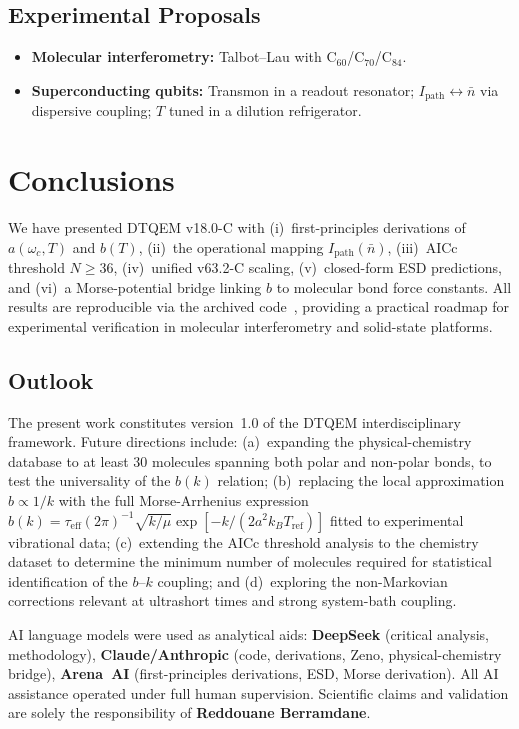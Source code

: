 \documentclass[reprint,amsmath,amssymb,aps,pra,superscriptaddress]{revtex4-2}
\begin{document}
\subsection{Experimental Proposals}
\begin{itemize}
\item \textbf{Molecular interferometry:} Talbot--Lau with
$\mathrm{C}_{60}$/$\mathrm{C}_{70}$/$\mathrm{C}_{84}$.
\item \textbf{Superconducting qubits:} Transmon in a readout resonator;
$I_{\text{path}}\leftrightarrow\bar n$ via dispersive coupling;
$T$ tuned in a dilution refrigerator.
\end{itemize}

\section{Conclusions}
We have presented DTQEM v18.0-C with (i)~first-principles derivations of
$a(\omega_c,T)$ and $b(T)$, (ii)~the operational mapping
$I_{\text{path}}(\bar n)$, (iii)~AICc threshold $N\ge36$,
(iv)~unified v63.2-C scaling, (v)~closed-form ESD predictions, and
(vi)~a Morse-potential bridge linking $b$ to molecular bond force constants.
All results are reproducible via the archived code~\cite{zenodo_dtqem},
providing a practical roadmap for experimental verification in
molecular interferometry and solid-state platforms.

\subsection*{Outlook}
The present work constitutes version~1.0 of the DTQEM interdisciplinary
framework. Future directions include: (a)~expanding the physical-chemistry
database to at least 30 molecules spanning both polar and non-polar bonds, to
test the universality of the $b(k)$ relation; (b)~replacing the local
approximation $b\propto1/k$ with the full Morse-Arrhenius expression
$b(k)=\tau_{\text{eff}}(2\pi)^{-1}\sqrt{k/\mu}\exp[-k/(2a^2k_BT_{\text{ref}})]$
fitted to experimental vibrational data; (c)~extending the AICc threshold
analysis to the chemistry dataset to determine the minimum number of molecules
required for statistical identification of the $b$--$k$ coupling; and
(d)~exploring the non-Markovian corrections relevant at ultrashort times and
strong system-bath coupling.

\begin{acknowledgments}
AI language models were used as analytical aids:
\textbf{DeepSeek} (critical analysis, methodology),
\textbf{Claude/Anthropic} (code, derivations, Zeno, physical-chemistry bridge),
\textbf{Arena~AI} (first-principles derivations, ESD, Morse derivation).
All AI assistance operated under full human supervision.
Scientific claims and validation are solely the responsibility of
\textbf{Reddouane Berramdane}.
\end{acknowledgments}
\end{document}
